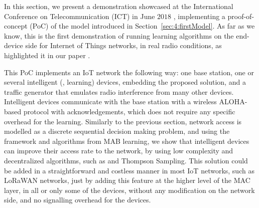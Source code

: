 

\graphicspath{{2-Chapters/4-Chapter/IEEE_WCNC_2019__DemoICT.git/pictures/}}

In this section, we present a demonstration showcased at the International Conference on Telecommunication (ICT) in June $2018$ \cite{Besson2018ICT,Besson2019WCNC}, implementing a proof-of-concept (PoC) of the model introduced in Section~\ref{sec:4:firstModel}.
%
As far as we know, this is the first demonstration of running learning algorithms on the end-device side for Internet of Things networks, in real radio conditions, as highlighted it in our paper \cite{MoyBesson2019}.

This PoC implements an IoT network the following way: one base station, one or several intelligent (\ie, learning) devices, embedding the proposed solution,
and a traffic generator that emulates radio interference from many other devices.
Intelligent devices communicate with the base station with a wireless ALOHA-based protocol with acknowledgements, which does not require any specific overhead for the learning.
%
Similarly to the previous section, network access is modelled as a discrete sequential decision making problem, and using the framework and algorithms from MAB learning, we show that intelligent devices can improve their access rate to the network, by using low complexity and decentralized algorithms, such as \UCB{} and Thompson Sampling.
%
This solution could be added in a straightforward and costless manner in most IoT networks, such as LoRaWAN networks, just by adding this feature at the higher level of the MAC layer, in all or only some of the devices, without any modification on the network side, and no signalling overhead for the devices.

